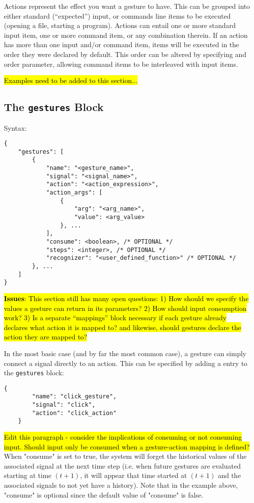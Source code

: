 \documentclass{article}
\begin{document}
Actions represent the effect you want a gesture to have. This can be grouped into either standard (``expected'') input, or commands line items to be executed (opening a file, starting a program). Actions can entail one or more standard input item, one or more command item, or any combination therein. If an action has more than one input and/or command item, items will be executed in the order they were declared by default. This order can be altered by specifying and order parameter, allowing command items to be interleaved with input items.

\hl{Examples need to be added to this section...}

\subsection{The \texttt{gestures} Block}
Syntax:

\begin{Verbatim}[baselinestretch=1.0]
{
    "gestures": [
        {
            "name": "<gesture_name>",
            "signal": "<signal_name>",
            "action": "<action_expression>",
            "action_args": [
                {
                    "arg": "<arg_name>",
                    "value": <arg_value>
                }, ...
            ],
            "consume": <boolean>, /* OPTIONAL */
            "steps": <integer>, /* OPTIONAL */
            "recognizer": "<user_defined_function>" /* OPTIONAL */
        }, ...
    ]
}
\end{Verbatim}

\noindent
\hl{\textbf{Issues}: This section still has many open questions: 1) How should we specify the values a gesture can return in its parameters? 2) How should input consumption work? 3) Is a separate ``mappings'' block necessary if each gesture already declares what action it is mapped to? and likewise, should gestures declare the action they are mapped to?}

In the most basic case (and by far the most common case), a gesture can simply connect a signal directly to an action. This can be specified by adding a entry to the \texttt{gestures} block:

\begin{Verbatim}[baselinestretch=1.0]
    {
        "name": "click_gesture",
        "signal": "click",
        "action": "click_action"
    }
\end{Verbatim}

\hl{Edit this paragraph - consider the implications of consuming or not consuming input. Should input only be consumed when a gesture-action mapping is defined?} When "consume" is set to true, the system will forget the historical values of the associated signal at the next time step (i.e. when future gestures are evaluated starting at time $(t+1)$, it will appear that time started at $(t+1)$ and the associated signals to not yet have a history). Note that in the example above, "consume" is optional since the default value of "consume" is false.
\end{document}
